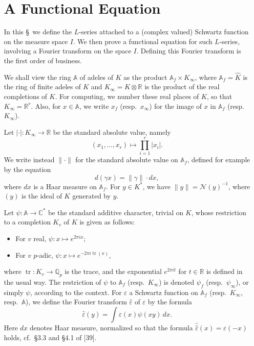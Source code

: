\documentclass[12pt,a4paper]{article}
\theoremstyle{plain}
\theoremstyle{definition}
\DeclareMathOperator{\tr}{tr}
\newcommand{\Q}{\mathbb{Q}}
\newcommand{\R}{\mathbb{R}}
\newcommand{\C}{\mathbb{C}}
\newcommand{\A}{\mathbb{A}}
\begin{document}
\section{A Functional Equation}

In this \S\ we define the $L$-series attached to a (complex valued) Schwartz function on the measure space $I$. We then prove a functional equation for such $L$-series, involving a Fourier transform on the space $I$. Defining this Fourier transform is the first order of business.

We shall view the ring $\A$ of adeles of $K$ as the product $\A_f\times K_{\infty}$, where $\A_f=\hat{K}$ is the ring of finite adeles of $K$ and $K_{\infty}=K\otimes\R$ is the product of the real completions of $K$. For computing, we number these real places of $K$, so that $K_{\infty}=\R^r$. Also, for $x\in\A$, we write $x_f$ (resp.~$x_{\infty}$) for the image of $x$ in $\A_f$ (resp.~$K_{\infty}$).

Let $|\cdot|:K_{\infty}\to\R$ be the standard absolute value, namely
\[
(x_1,\dots,x_r)\mapsto\prod_{i=1}^r|x_i|.
\]
We write instead $\|\cdot\|$ for the standard absolute value on $\A_f$, defined for example by the equation
\[
d(\gamma x)=\|\gamma\|\cdot dx,
\]
where $dx$ is a Haar measure on $\A_f$. For $y\in K^*$, we have $\|y\|=\mathcal{N}(y)^{-1}$, where $(y)$ is the ideal of $K$ generated by $y$.

Let $\psi:\A\to\C^*$ be the standard additive character, trivial on $K$, whose restriction to a completion $K_v$ of $K$ is given as follows:
\begin{itemize}[leftmargin=2em]
\item For $v$ real, $\psi:x\mapsto e^{2\pi ix}$;
\item For $v$ $p$-adic, $\psi:x\mapsto e^{-2\pi i\tr(x)}$,
\end{itemize}
where $\tr:K_v\to\Q_p$ is the trace, and the exponential $e^{2\pi it}$ for $t\in\R$ is defined in the usual way. The restriction of $\psi$ to $\A_f$ (resp.~$K_{\infty}$) is denoted $\psi_f$ (resp.~$\psi_{\infty}$), or simply $\psi$, according to the context. For $\varepsilon$ a Schwartz function on $\A_f$ (resp.~$K_{\infty}$, resp.~$\A$), we define the Fourier transform $\hat{\varepsilon}$ of $\varepsilon$ by the formula
\begin{equation}\label{eq:fourier}
\hat{\varepsilon}(y)=\int\varepsilon(x)\psi(xy)\,dx.
\end{equation}
Here $dx$ denotes Haar measure, normalized so that the formula $\hat{\hat{\varepsilon}}(x)=\varepsilon(-x)$ holds, cf.~\S3.3 and \S4.1 of [39].
\end{document}
